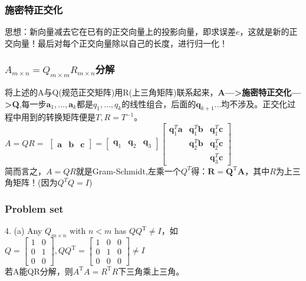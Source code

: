     \subsubsection{施密特正交化}
    思想：新向量减去它在已有的正交向量上的投影向量，即求误差$e$，这就是新的正交向量！最后对每个正交向量除以自己的长度，进行归一化！
    \subsubsection{$A_{m\times n}=Q_{m\times m}R_{m\times n}$分解}
    将上述的A与Q(规范正交矩阵)用R(上三角矩阵)联系起来，\textbf{A--->施密特正交化--->Q},每一步$\boldsymbol{a}_{1}, \dots, \boldsymbol{a}_{k}$都是$q_{1}, \ldots, q_{k}$的线性组合，后面的$\bm{q}_{k+1}...$均不涉及。正交化过程中用到的转换矩阵便是$T,R=T^{-1}$。
    \\
    $A=Q R=$
    $\left[\begin{array}{lll}{\bm{a}} & {\bm{b}} & {\bm{c}}\end{array}\right]=\left[\begin{array}{lll}{\bm{q}_{1}} & {\bm{q}_{2}} & {\bm{q}_{3}}\end{array}\right]\left[\begin{array}{ccc}{\bm{q}_{1}^{T} \bm{a}} & {\bm{q}_{1}^{T} \bm{b}} & {\bm{q}_{1}^{T} \bm{c}} \\ {} & {\bm{q}_{2}^{T} \bm{b}} & {\bm{q}_{2}^{T} \bm{c}} \\ {} & {} & {\bm{q}_{3}^{T} \bm{c}}\end{array}\right]$
    \\
    简而言之，$A=Q R$就是Gram-Schmidt,左乘一个$Q^T$得：$\boldsymbol{R}=\boldsymbol{Q}^{\mathrm{T}} \boldsymbol{A}$，其中$R$为上三角矩阵！(因为$Q^T Q = I$)

    \subsubsection{Problem set}
    4. (a) Any $Q_{m\times n}$ with $n<m$ has $Q Q^{\mathrm{T}} \neq I$，如$Q=\left[\begin{array}{ll}{1} & {0} \\ {0} & {1} \\ {0} & {0}\end{array}\right], Q Q^{\mathrm{T}}=\left[\begin{array}{ccc}{1} & {0} & {0} \\ {0} & {1} & {0} \\ {0} & {0} & {0}\end{array}\right] \neq I$
    \\
    若A能QR分解，则$A^{\mathrm{T}} A=R^{\mathrm{T}} R$下三角乘上三角。